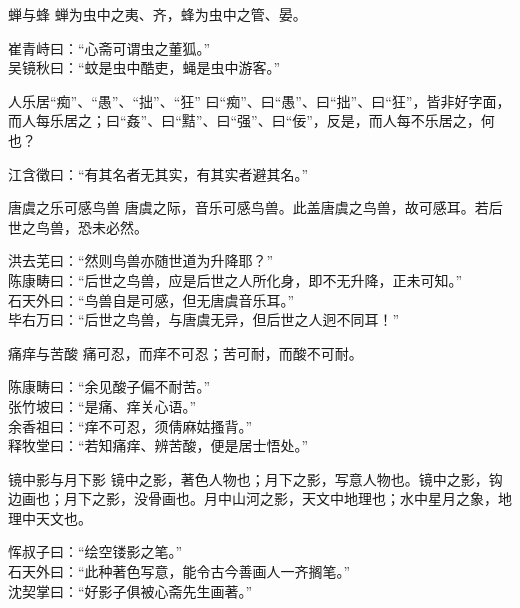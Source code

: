 \begin{yulu}{蝉与蜂}
蝉为虫中之夷、齐，蜂为虫中之管、晏。
\begin{comments}
崔青峙曰：“心斋可谓虫之董狐。” \\
吴镜秋曰：“蚊是虫中酷吏，蝇是虫中游客。”
\end{comments}
\end{yulu}

\begin{yulu}{人乐居“痴”、“愚”、“拙”、“狂”}
曰“痴”、曰“愚”、曰“拙”、曰“狂”，皆非好字面，而人每乐居之；曰“姦”、曰“黠”、曰“强”、曰“佞”，反是，而人每不乐居之，何也？
\begin{comments}
江含徵曰：“有其名者无其实，有其实者避其名。”
\end{comments}
\end{yulu}

\begin{yulu}{唐虞之乐可感鸟兽}
唐虞之际，音乐可感鸟兽。此盖唐虞之鸟兽，故可感耳。若后世之鸟兽，恐未必然。
\begin{comments}
洪去芜曰：“然则鸟兽亦随世道为升降耶？” \\
陈康畴曰：“后世之鸟兽，应是后世之人所化身，即不无升降，正未可知。” \\
石天外曰：“鸟兽自是可感，但无唐虞音乐耳。” \\
毕右万曰：“后世之鸟兽，与唐虞无异，但后世之人迥不同耳！”
\end{comments}
\end{yulu}

\begin{yulu}{痛痒与苦酸}
痛可忍，而痒不可忍；苦可耐，而酸不可耐。
\begin{comments}
陈康畴曰：“余见酸子偏不耐苦。” \\
张竹坡曰：“是痛、痒关心语。” \\
余香祖曰：“痒不可忍，须倩麻姑搔背。” \\
释牧堂曰：“若知痛痒、辨苦酸，便是居士悟处。”
\end{comments}
\end{yulu}

\begin{yulu}{镜中影与月下影}
镜中之影，著色人物也；月下之影，写意人物也。镜中之影，钩边画也；月下之影，没骨画也。月中山河之影，天文中地理也；水中星月之象，地理中天文也。
\begin{comments}
恽叔子曰：“绘空镂影之笔。” \\
石天外曰：“此种著色写意，能令古今善画人一齐搁笔。” \\
沈契掌曰：“好影子俱被心斋先生画著。”
\end{comments}
\end{yulu}

